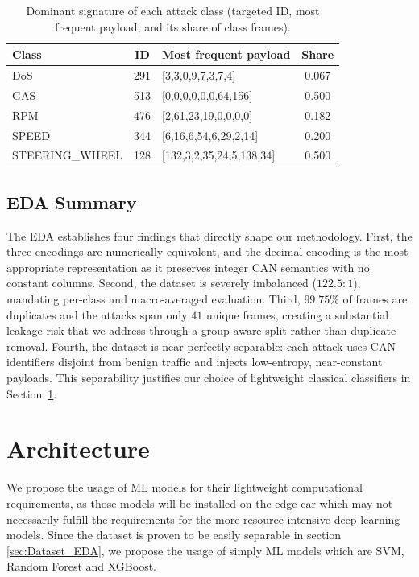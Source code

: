 \documentclass[conference]{IEEEtran}
\begin{document}
\begin{table}[htbp]
\centering
\caption{Dominant signature of each attack class (targeted ID, most frequent payload, and its share of class frames).}
\label{tab:attack_signatures}
\begin{tabular}{lcl c}
\hline
Class & ID & Most frequent payload & Share \\
\hline
DoS             & 291 & [3,3,0,9,7,3,7,4]      & 0.067 \\
GAS             & 513 & [0,0,0,0,0,0,64,156]   & 0.500 \\
RPM             & 476 & [2,61,23,19,0,0,0,0]   & 0.182 \\
SPEED           & 344 & [6,16,6,54,6,29,2,14]  & 0.200 \\
STEERING\_WHEEL & 128 & [132,3,2,35,24,5,138,34] & 0.500 \\
\hline
\end{tabular}
\end{table}

\subsection{EDA Summary}

The EDA establishes four findings that directly shape our methodology. First, the
three encodings are numerically equivalent, and the decimal encoding is the most
appropriate representation as it preserves integer CAN semantics with no constant
columns. Second, the dataset is severely imbalanced ($122.5{:}1$), mandating
per-class and macro-averaged evaluation. Third, $99.75\%$ of frames are
duplicates and the attacks span only $41$ unique frames, creating a substantial
leakage risk that we address through a group-aware split rather than duplicate
removal. Fourth, the dataset is near-perfectly separable: each attack uses CAN
identifiers disjoint from benign traffic and injects low-entropy, near-constant
payloads. This separability justifies our choice of lightweight classical
classifiers in Section~\ref{sec:architecture}.

\section{Architecture}
\label{sec:architecture}
We propose the usage of ML models for their lightweight computational requirements, as those models will be installed on the edge car which may not necessarily fulfill the requirements for the more resource intensive deep learning models.
Since the dataset is proven to be easily separable in section \ref{sec:Dataset_EDA}, we propose the usage of simply ML models which are SVM, Random Forest and XGBoost.
\end{document}
